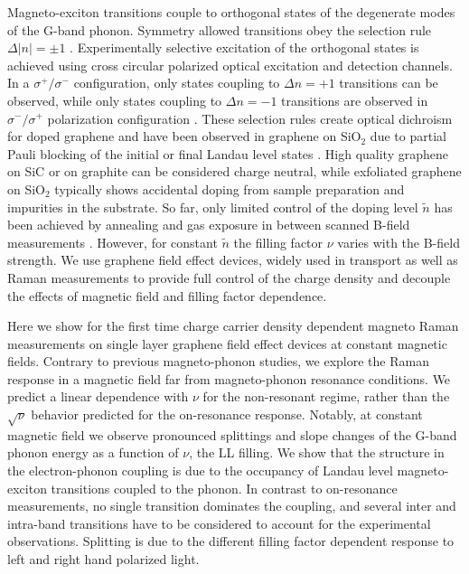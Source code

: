 \documentclass[prl,aps,superscriptaddress,showpacs,reprint]{revtex4-1}
\begin{document}
Magneto-exciton transitions couple to orthogonal states of the degenerate modes of the G-band phonon. Symmetry allowed transitions obey the selection rule $\Delta\left|n\right|=\pm 1$ \cite{PhysRevB.84.235138}. Experimentally selective excitation of the orthogonal states is achieved using cross circular polarized optical excitation and detection channels. In a $\sigma^+/\sigma^-$ configuration, only states coupling to $\Delta n=+1$ transitions can be observed, while only states coupling to $\Delta n=-1$ transitions are observed in $\sigma^-/\sigma^+$ polarization configuration \cite{kossacki2012circular,PhysRevLett.110.227402,PhysRevB.84.235138,kuhne2012polarization}.
These selection rules create optical dichroism for doped graphene \cite{goerbig2007filling,ando2007magnetic} and have been observed in graphene on SiO$_2$ due to partial Pauli blocking of the initial or final Landau level states \cite{PhysRevLett.110.227402,kossacki2012circular}. 
High quality graphene on SiC or on graphite can be considered charge neutral, while exfoliated graphene on SiO$_2$ typically shows accidental doping from sample preparation and impurities in the substrate. So far, only limited control of the doping level $\widetilde{n}$ has been achieved by annealing and gas exposure in between scanned B-field measurements \cite{PhysRevLett.110.227402}. However, for constant $\widetilde{n}$ the filling factor $\nu$ varies with the B-field strength. We use graphene field effect devices, widely used in transport \cite{novoselov2004electric,novoselov2005two,zhang2005experimental} as well as Raman measurements \cite{pisana2007breakdown,yan2007electric,stampfer2007raman} to provide full control of the charge density and decouple the effects of magnetic field and filling factor dependence.


Here we show for the first time charge carrier density dependent magneto Raman measurements on single layer graphene field effect devices at constant magnetic fields. Contrary to previous magneto-phonon studies, we explore the Raman response in a magnetic field far from magneto-phonon resonance conditions. We predict a linear dependence with $\nu$ for the non-resonant regime, rather than the $\sqrt{\nu}$ behavior predicted for the on-resonance response. Notably, at constant magnetic field we observe pronounced splittings and slope changes of the G-band phonon energy as a function of $\nu$, the LL filling. We show that the structure in the electron-phonon coupling is due to the occupancy of Landau level magneto-exciton transitions coupled to the phonon. In contrast to on-resonance measurements, no single transition dominates the coupling, and several inter and intra-band transitions have to be considered to account for the experimental observations. Splitting is due to the different filling factor dependent response to left and right hand polarized light.   
\end{document}
